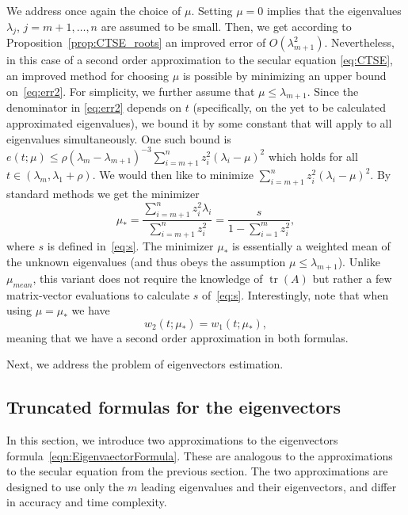 \documentclass[11pt]{article}
\begin{document}
We address once again the choice of $\mu$. Setting $\mu = 0$ implies that the eigenvalues $\lambda_j$, $j=m+1,\ldots,n$ are assumed to be small. Then, we get according to Proposition~\ref{prop:CTSE_roots} an improved error of $O(\lambda_{m+1}^2)$. Nevertheless, in this case of a second order approximation to the secular equation \eqref{eq:CTSE}, an improved method for choosing $\mu$ is possible by minimizing an upper bound on~\eqref{eq:err2}. For simplicity, we further assume that $\mu \leq \lambda_{m+1}$. Since the denominator in \eqref{eq:err2} depends on $t$ (specifically, on the yet to be calculated approximated eigenvalues), we bound it by some constant that will apply to all eigenvalues simultaneously. One such bound is $e(t ; \mu) \leq \rho (\lambda_{m} - \lambda_{m+1})^{-3} \sum_{i=m+1}^{n} z_i^2 (\lambda_i - \mu)^2$ which holds for all $t \in (\lambda_{m}, \lambda_{1} + \rho)$. We would then like to minimize $\sum_{i=m+1}^{n}z_i^2(\lambda_i - \mu)^2$. By standard methods we get the minimizer
\begin{equation} \label{eq:mu_opt}
\mu_\ast = \frac{\sum_{i=m+1}^nz_i^2\lambda_i}{ \sum_{i=m+1}^{n}z_i^2} = \frac{s}{1 - \sum_{i=1}^{m}z_i^2} ,
\end{equation}
where $s$ is defined in~\eqref{eq:s}. The minimizer $\mu_\ast$ is essentially a weighted mean of the unknown eigenvalues (and thus obeys the assumption $\mu \leq \lambda_{m+1}$). Unlike $\mu_{mean}$, this variant does not require the knowledge of $\operatorname{tr}(A)$ but rather a few matrix-vector evaluations to calculate $s$ of~\eqref{eq:s}. Interestingly, note that when using $\mu = \mu_\ast$ we have 
\begin{equation}
w_2(t ; \mu_\ast) = w_1(t ; \mu_\ast) ,
\end{equation}
meaning that we have a second order approximation in both formulas. 

Next, we address the problem of eigenvectors estimation.

\subsection{Truncated formulas for the eigenvectors}
In this section, we introduce two approximations to the eigenvectors formula~\eqref{eqn:EigenvaectorFormula}. These are analogous to the approximations to the secular equation from the previous section. The two approximations are designed to use only the $m$ leading eigenvalues and their eigenvectors, and differ in accuracy and time complexity. 
 
\end{document}
